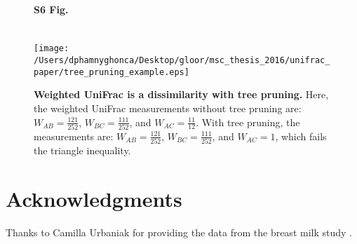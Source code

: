 \documentclass[10pt,letterpaper]{article}
\begin{document}
\begin{figure}[h]
\paragraph*{S6 Fig.}\mbox{}\\
\texttt{[image: /Users/dphamnyghonca/Desktop/gloor/msc\_thesis\_2016/unifrac\_paper/tree\_pruning\_example.eps]}
\caption[Weighted UniFrac is a dissimilarity with tree pruning.]{{\bf Weighted UniFrac is a dissimilarity with tree pruning.} Here, the weighted UniFrac measurements without tree pruning are: $W_{AB} = \frac{121}{252}$, $W_{BC} = \frac{111}{252}$, and $W_{AC} = \frac{11}{12}$. With tree pruning, the measurements are: $W_{AB} = \frac{121}{252}$, $W_{BC} = \frac{111}{252}$, and $W_{AC} = 1$, which fails the triangle inequality.}
\label{S4_Fig}
\end{figure}

\section*{Acknowledgments}
Thanks to Camilla Urbaniak for providing the data from the breast milk study \cite{urbaniak2016human}.

\nolinenumbers

%
%
% 

\end{document}
